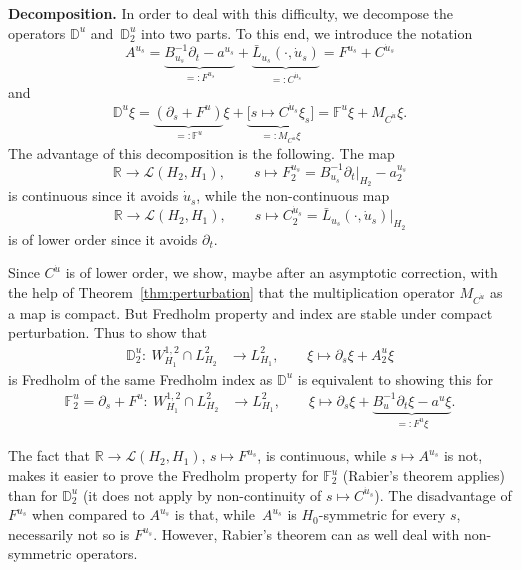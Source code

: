 \documentclass[pdftex]{sigma}
\numberwithin{equation}{section}
\newcommand{\D}{{\mathbb{D}}}
\newcommand{\F}{{\mathbb{F}}}
\newcommand{\R}{{\mathbb{R}}}
\newcommand{\Ll}{{\mathcal{L}}} %
\newcommand{\p}{{\partial}}
\newcommand{\1}{{{\mathchoice {\rm 1\mskip-4mu l} {\rm 1\mskip-4mu l}
{\rm 1\mskip-4.5mu l} {\rm 1\mskip-5mu l}}}}
\begin{document}
\textbf{Decomposition.}
In order to deal with this difficulty, we decompose the operators
$\D^u$ and~$\D^u_2$ into two parts.
To this end, we introduce the notation
\[
 A^{u_s}=
 \underbrace{B_{u_s}^{-1}\p_t-a^{u_s}}_{=:F^{u_s}}
 +\underbrace{\bar L_{u_s}(\cdot,\dot u_s)}_{=:C^{\dot u_s}}
 =F^{u_s}+C^{\dot u_s}
\]
and
\begin{equation*}%
 \D^u\xi
 =\underbrace{(\p_s+F^u)}_{=:\F^u}\xi
 +\underbrace{\bigl[s\mapsto C^{\dot u_s}\xi_s\bigr]}_{=:
 M_{C^{\dot u}}\xi}
 =\F^u\xi+M_{C^{\dot u}}\xi .
\end{equation*}
The advantage of this decomposition is the following.
The map
\[
 \R\to\Ll(H_2,H_1),\qquad s\mapsto
 F^{u_s}_2=B_{u_s}^{-1}\p_t |_{H_2}-a^{u_s}_2
\]
is continuous since it avoids $\dot u_s$, while the non-continuous map
\[
 \R\to\Ll(H_2,H_1)
 ,\qquad
 s\mapsto C^{\dot u_s}_2=\bar L_{u_s}(\cdot,\dot u_s) |_{H_2}
\]
is of lower order since it avoids $\p_t$.

Since $C^{\dot u}$ is of lower order, we show, maybe after an
asymptotic correction, with the help of
Theorem~\ref{thm:perturbation}
that the multiplication operator $M_{C^{\dot u}}$ as a map
 is compact.
But Fredholm property and index are stable under compact perturbation.
Thus to show that
\begin{equation*}%
\begin{split}
 \D^u_2\colon\
 W^{1,2}_{H_1}\cap L^2_{H_2}
 &\to L^2_{H_1},
\qquad
 \xi \mapsto \p_s\xi+A^u_2\xi
\end{split}
\end{equation*}
is Fredholm of the same Fredholm index as $\D^u$
is equivalent to showing this for
\begin{equation*}
\begin{split}
 \F^u_2=\p_s+F^u\colon\
 W^{1,2}_{H_1}\cap L^2_{H_2}
 &\to L^2_{H_1},
\qquad
 \xi \mapsto \p_s\xi+\underbrace{B_u^{-1}\p_t\xi-a^u\xi}_{=:F^u\xi} .
\end{split}
\end{equation*}

The fact that $\R\to\Ll(H_2,H_1)$, $s\mapsto F^{u_s}$, is continuous,
while $s\mapsto A^{u_s}$ is not, makes it easier to prove
the Fredholm property for $\F^u_2$ (Rabier's theorem applies)
than for $\D^u_2$ \big(it does not apply by non-continuity of
$s\mapsto C^{\dot u_s}$\big).
The disadvantage of $F^{u_s}$ when compared to $A^{u_s}$ is that, while~$A^{u_s}$ is $H_0$-symmetric for every $s$,
necessarily not so is $F^{u_s}$.
However, Rabier's theorem can as well deal with non-symmetric
operators.
\end{document}

